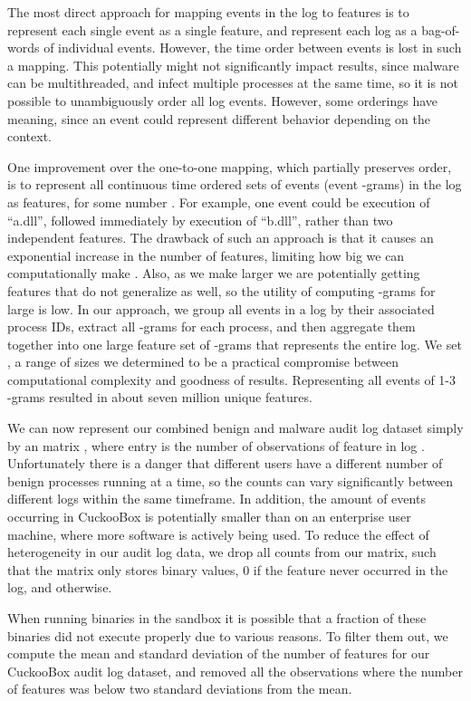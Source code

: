 \documentclass{sig-alternate-2013}
\begin{document}
The most direct approach for mapping events in the log to features is to represent each single event as a single feature, and represent each log as a bag-of-words of individual events. However, the time order between events is lost in such a mapping. This potentially might not significantly impact results, since malware can be multithreaded, and infect multiple processes at the same time, so it is not possible to unambiguously order all log events. However, some orderings have meaning, since an event could represent different behavior depending on the context.

One improvement over the one-to-one mapping, which partially preserves order, is to represent all  continuous time ordered sets of events (event -grams) in the log as features, for some number . For example, one event could be execution of ``a.dll'', followed immediately by execution of ``b.dll'', rather than two independent features. The drawback of such an approach is that it causes an exponential increase in the number of features, limiting how big we can computationally make . Also, as we make  larger we are potentially getting features that do not generalize as well, so the utility of computing -grams for large  is low. In our approach, we group all events in a log by their associated process IDs, extract all -grams for each process, and then aggregate them together into one large feature set of -grams that represents the entire log. We set , a range of sizes we determined to be a practical compromise between computational complexity and goodness of results. Representing all events of 1-3 -grams resulted in about seven million unique features. 

We can now represent our combined benign and malware audit log dataset simply by an  matrix , where entry  is the number of observations of feature  in log . Unfortunately there is a danger that different users have a different number of benign processes running at a time, so the counts can vary significantly between different logs within the same timeframe. In addition, the amount of events occurring in CuckooBox is potentially smaller than on an enterprise user machine, where more software is actively being used. To reduce the effect of heterogeneity in our audit log data, we drop all counts from our matrix, such that the matrix only stores binary values, 0 if the feature never occurred in the log, and  otherwise.

When running binaries in the sandbox it is possible that a fraction of these binaries did not execute properly due to various reasons. To filter them out, we compute the mean and standard deviation of the number of features for our CuckooBox audit log dataset, and removed all the observations where the number of features was below two standard deviations from the mean. 
\end{document}
